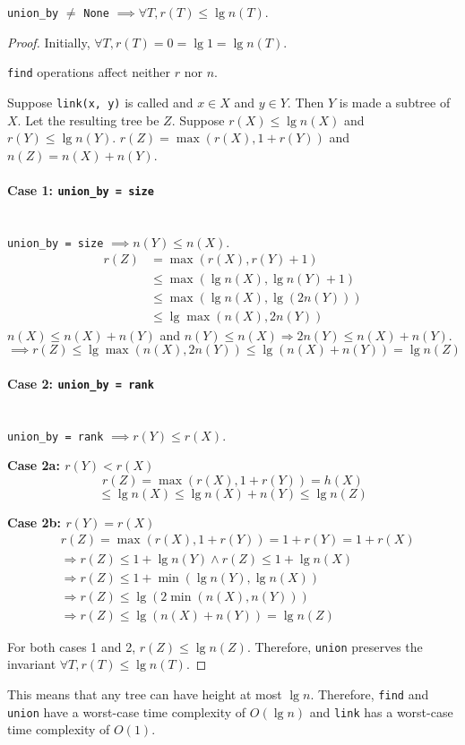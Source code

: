 \begin{theorem}
\textup{\texttt{union\_by}} $\neq$ \textup{\texttt{None}} $\implies \forall T, r(T) \le \lg n(T)$.
\end{theorem}
\begin{proof}
Initially, $\forall T, r(T) = 0 = \lg 1 = \lg n(T)$.

\texttt{find} operations affect neither $r$ nor $n$.

Suppose \texttt{link(x, y)} is called and $x \in X$ and $y \in Y$.
Then $Y$ is made a subtree of $X$. Let the resulting tree be $Z$.
Suppose $r(X) \le \lg n(X)$ and $r(Y) \le \lg n(Y)$.
$r(Z) = \max(r(X), 1 + r(Y))$ and $n(Z) = n(X) + n(Y)$.

\paragraph{Case 1: \texttt{union\_by = size}} \mbox{}\\
\texttt{union\_by = size} $\implies n(Y) \le n(X)$.
\begin{align*}
r(Z) &= \max(r(X), r(Y) + 1)
\\ &\le \max(\lg n(X), \lg n(Y) + 1)
\\ &\le \max(\lg n(X), \lg(2n(Y)))
\\ &\le \lg\max(n(X), 2n(Y))
\end{align*}
$n(X) \le n(X) + n(Y)$ and
$n(Y) \le n(X) \Rightarrow 2n(Y) \le n(X) + n(Y)$.
\[\implies r(Z) \le \lg\max(n(X), 2n(Y)) \le \lg(n(X) + n(Y)) = \lg n(Z) \]

\paragraph{Case 2: \texttt{union\_by = rank}} \mbox{}\\
\texttt{union\_by = rank} $\implies r(Y) \le r(X)$.

\textbf{Case 2a: $r(Y) < r(X)$}\\
\[ r(Z) = \max(r(X), 1 + r(Y)) = h(X) \]
\[ \le \lg n(X) \le \lg n(X) + n(Y) \le \lg n(Z) \]

\textbf{Case 2b: $r(Y) = r(X)$}
\begin{align*}
& r(Z) = \max(r(X), 1 + r(Y)) = 1 + r(Y) = 1 + r(X)
\\ &\Rightarrow r(Z) \le 1 + \lg n(Y) \wedge r(Z) \le 1 + \lg n(X)
\\ &\Rightarrow r(Z) \le 1 + \min(\lg n(Y), \lg n(X))
\\ &\Rightarrow r(Z) \le \lg(2\min(n(X), n(Y)))
\\ &\Rightarrow r(Z) \le \lg(n(X) + n(Y)) = \lg n(Z)
\end{align*}

For both cases 1 and 2, $r(Z) \le \lg n(Z)$.
Therefore, \texttt{union} preserves the invariant $\forall T, r(T) \le \lg n(T)$.
\end{proof}

This means that any tree can have height at most $\lg n$.
Therefore, \texttt{find} and \texttt{union} have a worst-case time complexity of $O(\lg n)$
and \texttt{link} has a worst-case time complexity of $O(1)$.


